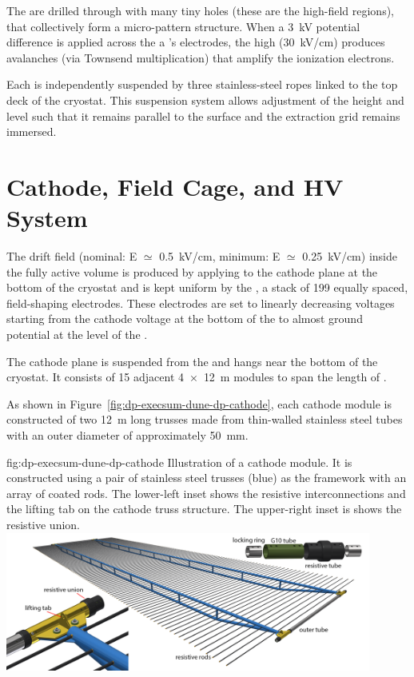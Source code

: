 The  are drilled through with many tiny holes (these are the high-field regions), that collectively form a micro-pattern structure. When a \SI{3}{kV} potential difference is applied across the a 's electrodes, the high \efield (\SI{30}{kV/cm}) produces avalanches (via Townsend multiplication) that amplify the ionization electrons.  


Each  is independently suspended by three stainless-steel ropes linked to the top deck of the cryostat. This suspension system allows adjustment of the  height and level such that it remains parallel to the  surface and the extraction grid remains immersed.   

\section{Cathode, Field Cage, and HV System}
\label{sec:dp-execsum-cathode}

The drift field (nominal: E ${\simeq}$ \SI{0.5}{kV/cm}, minimum: E ${\simeq}$ \SI{0.25}{kV/cm}) inside the fully active  volume is produced by applying  to the cathode plane at the bottom of the cryostat and is kept uniform by the , a stack of \num{199} equally spaced, field-shaping electrodes. 
These electrodes are set to linearly decreasing voltages starting from the cathode voltage at the bottom of the  to almost ground potential at the level of the . 


The cathode plane  is suspended from the  and hangs near the  bottom of the cryostat. It consists of 15 adjacent \SI{4x12}{m} 
modules to span the \dptpclen length of . 

As shown in  Figure~\ref{fig:dp-execsum-dune-dp-cathode}, each cathode module is constructed of two \SI{12}{m} long trusses made from thin-walled stainless steel tubes with an  outer diameter of approximately \SI{50}{mm}. 


\begin{dunefigure}{fig:dp-execsum-dune-dp-cathode}
{Illustration of a  cathode module.  It is constructed using a pair of stainless steel trusses (blue) as the framework with an array of coated  rods. 
The lower-left inset shows the resistive interconnections and the lifting tab on the cathode truss structure. The upper-right inset is shows the resistive union.}
\includegraphics[width=0.9\textwidth]{graphics/DP_HVS_cathode_module.png}
\end{dunefigure}

